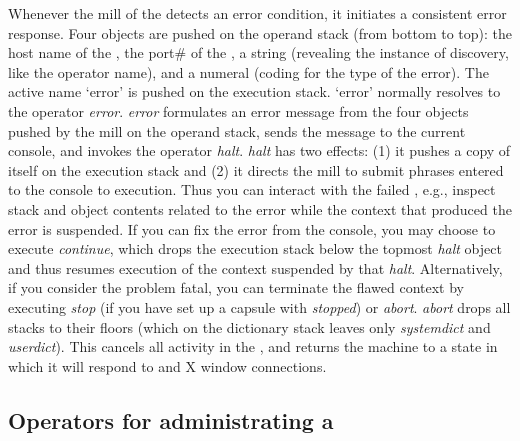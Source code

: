 Whenever the mill of the  detects an error condition, it initiates a consistent error response. Four objects are pushed on the operand stack (from bottom to top): the host name of the , the port\# of the , a string (revealing the instance of discovery, like the operator name), and a numeral (coding for the type of the error). The active name `error' is pushed on the execution stack. `error' normally resolves to the operator \emph{error}. \emph{error} formulates an error message from the four objects pushed by the mill on the operand stack, sends the message to the current console, and invokes the operator \emph{halt}. \emph{halt} has two effects: (1) it pushes a copy of itself on the execution stack and (2) it directs the mill to submit phrases entered to the console to execution. Thus you can interact with the failed , e.g., inspect stack and object contents related to the error while the context that produced the error is suspended. If you can fix the error from the console, you may choose to execute \emph{continue}, which drops the execution stack below the topmost \emph{halt} object and thus resumes execution of the context suspended by that \emph{halt}. Alternatively, if you consider the problem fatal, you can terminate the flawed context by executing \emph{stop} (if you have set up a capsule with \emph{stopped}) or \emph{abort}. \emph{abort} drops all stacks to their floors (which on the dictionary stack leaves only \emph{systemdict} and \emph{userdict}). This cancels all activity in the , and returns the machine to a state in which it will respond to  and X window connections.


\subsection{Operators for administrating  a }\label{ssec:opsdnode} 




